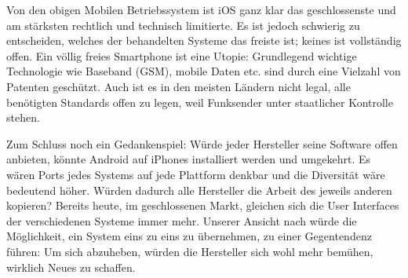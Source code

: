 Von den obigen Mobilen Betriebssystem ist iOS ganz klar das geschlossenste und am stärksten rechtlich und technisch limitierte. Es ist jedoch schwierig zu entscheiden, welches der behandelten Systeme das freiste ist; keines ist vollständig offen. Ein völlig freies Smartphone ist eine Utopie: Grundlegend wichtige Technologie wie Baseband (GSM), mobile Daten etc. sind durch eine Vielzahl von Patenten geschützt. Auch ist es in den meisten Ländern nicht legal, alle benötigten Standards offen zu legen, weil Funksender unter staatlicher Kontrolle stehen.

Zum Schluss noch ein Gedankenspiel: Würde jeder Hersteller seine Software offen anbieten, könnte Android auf iPhones installiert werden und umgekehrt. Es wären Ports jedes Systems auf jede Plattform denkbar und die Diversität wäre bedeutend höher. Würden dadurch alle Hersteller die Arbeit des jeweils anderen kopieren? Bereits heute, im geschlossenen Markt, gleichen sich die User Interfaces der verschiedenen Systeme immer mehr. Unserer Ansicht nach würde die Möglichkeit, ein System eins zu eins zu übernehmen, zu einer Gegentendenz führen: Um sich abzuheben, würden die Hersteller sich wohl mehr bemühen, wirklich Neues zu schaffen.